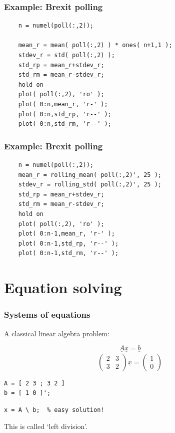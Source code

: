 \documentclass[11pt]{beamer}
\begin{document}
\begin{frame}[fragile]
	\frametitle{Example:  Brexit polling}
	
	\begin{Verbatim}
    n = numel(poll(:,2));
    
    mean_r = mean( poll(:,2) ) * ones( n+1,1 );
    stdev_r = std( poll(:,2) );
    std_rp = mean_r+stdev_r;
    std_rm = mean_r-stdev_r;
    hold on
    plot( poll(:,2), 'ro' );
    plot( 0:n,mean_r, 'r-' );
    plot( 0:n,std_rp, 'r--' );
    plot( 0:n,std_rm, 'r--' );
	\end{Verbatim}
\end{frame}

\begin{frame}[fragile]
	\frametitle{Example:  Brexit polling}
	
	\begin{Verbatim}
    n = numel(poll(:,2));
    mean_r = rolling_mean( poll(:,2)', 25 );
    stdev_r = rolling_std( poll(:,2)', 25 );
    std_rp = mean_r+stdev_r;
    std_rm = mean_r-stdev_r;
    hold on
    plot( poll(:,2), 'ro' );
    plot( 0:n-1,mean_r, 'r-' );
    plot( 0:n-1,std_rp, 'r--' );
    plot( 0:n-1,std_rm, 'r--' );
	\end{Verbatim}
\end{frame}

\section{Equation solving}

\begin{frame}[fragile]
  \frametitle{Systems of equations}
  \Enlarge

  \begin{enumerate}
  \myitem  A classical linear algebra problem:
  \end{enumerate}
  $$
\underline{\underline{A}} \underline{x} = \underline{b}
  $$
  $$
\left( \begin{array}{cc}
  2 & 3 \\
  3 & 2
\end{array} \right)
\underline{x}
=
\left( \begin{array}{c}
  1 \\
  0
\end{array} \right)
  $$
  \begin{Verbatim}
A = [ 2 3 ; 3 2 ]
b = [ 1 0 ]';
  \end{Verbatim}
  \begin{Verbatim}
x = A \ b;  % easy solution!
  \end{Verbatim}
  \begin{enumerate}
  \myitem  This is called `left division'.
  \end{enumerate}
\end{frame}
\end{document}
